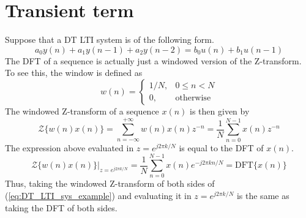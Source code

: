 \section{Transient term}
\label{appendix:transient_term}
Suppose that a DT LTI system is of the following form.
\begin{equation}
    a_0 y(n) + a_1 y(n-1) + a_2 y(n-2) = b_0 u(n) + b_1 u(n-1)
    \label{eq:DT_LTI_sys_example}
\end{equation}
The DFT of a sequence is actually just a windowed version of the Z-transform. To see this, the window is defined as
\begin{equation*}
    w(n) = \begin{cases}
        1/N , & 0 \leq n < N\\
        0 , & \text{otherwise}
    \end{cases}
\end{equation*}
The windowed Z-transform of a sequence $x(n)$ is then given by
\begin{equation*}
    \mathcal{Z}\{w(n) x(n)\} = \sum_{n=-\infty}^{+\infty} w(n) x(n) z^{-n} = \frac{1}{N} \sum_{n=0}^{N-1} x(n) z^{-n}
\end{equation*}
The expression above evaluated in $z = e^{j 2 \pi k/N}$ is equal to the DFT of $x(n)$.
\begin{equation*}
     \mathcal{Z}\{w(n) x(n)\}\rvert_{z=e^{j 2 \pi k/N}} = \frac{1}{N}\sum_{n=0}^{N-1} x(n) e^{-j 2 \pi k n/N} = \text{DFT}\{x(n)\}
\end{equation*}
Thus, taking the windowed Z-transform of both sides of (\ref{eq:DT_LTI_sys_example}) and evaluating it in $z = e^{j 2 \pi k/N}$ is the same as taking the DFT of both sides.

